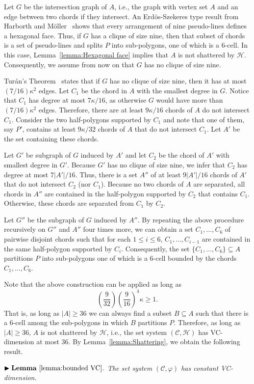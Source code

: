 \documentclass[a4paper,UKenglish]{lipics}
\begin{document}
Let $G$ be the intersection graph of $A$, i.e., the graph with vertex set $A$ and an edge between two chords if they intersect. An Erd\"os-Szekeres type result from Harborth and M\"oller~\cite{harborth1993esther} shows that every arrangement of nine pseudo-lines defines a hexagonal face.
Thus, if $G$ has a clique of size nine, then that subset of chords is a set of pseudo-lines and splits $P$ into sub-polygons, one of which is a $6$-cell. 
In this case, Lemma~\ref{lemma:Hexagonal face} implies that $A$ is not shattered by $\mathcal H$.
Consequently, we assume from now on that $G$ has no clique of size nine. 

Tur\'an's Theorem~\cite{turan1941extremal} states that if $G$ has no clique of size nine, then it has at most $(7/16)\kappa^2$ edges.
Let $C_1$ be the chord in $A$ with the smallest degree in $G$. Notice that $C_1$ has degree at most $7 \kappa/16$, as otherwise $G$ would have more than $(7/16)\kappa^2$ edges.
Therefore, there are at least $9 \kappa/16$ chords of $A$ do not intersect $C_1$. 
Consider the two half-polygons supported by $C_1$ and note that one of them, say $P'$, contains at least $9 \kappa/32$ chords of $A$ that do not intersect $C_1$. Let $A'$ be the set containing these chords.

Let $G'$ be subgraph of $G$ induced by $A'$ and let $C_2$ be the chord of $A'$ with smallest degree in $G'$.
Because $G'$ has no clique of size nine, we infer that $C_2$ has degree at most $7|A'|/16$.
Thus, there is a set $A''$ of at least $9 |A'| /16$ chords of $A'$ that do not intersect $C_2$ (nor $C_1$).
Because no two chords of $A$ are separated, all chords in $A''$ are contained in the half-polygon supported by $C_2$ that contains $C_1$. Otherwise, these chords are separated from $C_1$ by $C_2$.

Let $G''$ be the subgraph of $G$ induced by $A''$. By repeating the above procedure recursively on $G''$ and $A''$ four times more, we can obtain a set $C_1, \ldots, C_6$ of pairwise disjoint chords such that for each $1\leq i\leq 6$, $C_1, \ldots, C_{i-1}$ are contained in the same half-polygon supported by $C_i$.
Consequently, the set $\{C_1, \ldots, C_6\}\subseteq A$ partitions $P$ into sub-polygons one of which is a 6-cell bounded by the chords $C_1, \ldots, C_6$.

Note that the above construction can be applied as long as 
$$\left(\frac{9}{32}\right) \left(\frac{9}{16}\right)^4\kappa \geq 1.$$ 
That is, as long as $|A| \geq 36$ we can always find a subset $B\subseteq A$ such that there is a $6$-cell among the sub-polygons in which $B$ partitions $P$. 
Therefore, as long as $|A| \geq 36$, $A$ is not shattered by $\mathcal H$, i.e., the set system $(\mathcal C, \mathcal H)$ has VC-dimension at most 36.
By Lemma~\ref{lemma:Shattering}, we obtain the following result.

\vspace{.1in}
\noindent $\blacktriangleright \mathbf{Lemma~\ref{lemma:bounded VC}.}$ 
\emph{The set system $(\mathcal C, \varphi)$ has constant VC-dimension.
}
\end{document}

